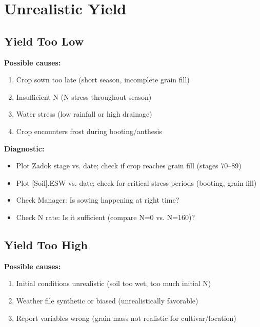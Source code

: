 \section{Unrealistic Yield}

\subsection{Yield Too Low}

\begin{warningbox}
\textbf{Possible causes:}
\begin{enumerate}
  \item Crop sown too late (short season, incomplete grain fill)
  \item Insufficient N (N stress throughout season)
  \item Water stress (low rainfall or high drainage)
  \item Crop encounters frost during booting/anthesis
\end{enumerate}
\end{warningbox}

\textbf{Diagnostic:}
\begin{itemize}
  \item Plot Zadok stage vs. date; check if crop reaches grain fill (stages 70--89)
  \item Plot [Soil].ESW vs. date; check for critical stress periods (booting, grain fill)
  \item Check Manager: Is sowing happening at right time?
  \item Check N rate: Is it sufficient (compare N=0 vs. N=160)?
\end{itemize}

\subsection{Yield Too High}

\begin{warningbox}
\textbf{Possible causes:}
\begin{enumerate}
  \item Initial conditions unrealistic (soil too wet, too much initial N)
  \item Weather file synthetic or biased (unrealistically favorable)
  \item Report variables wrong (grain mass not realistic for cultivar/location)
\end{enumerate}
\end{warningbox}

